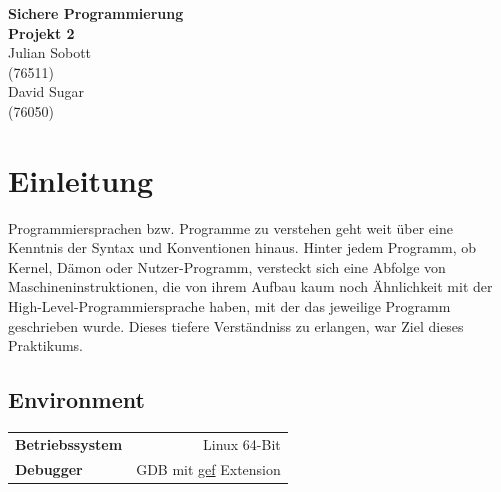 \documentclass[12pt]{article}
\begin{document}
\begin{center}
  \textbf{\LARGE Sichere Programmierung} \\[1ex]%
  \textbf{\Large Projekt 2}\\[2ex] %
  Julian Sobott \\ %
  (76511) \\ %
  David Sugar \\ %
  (76050) \\ %
  
\end{center}

\newpage
\tableofcontents
\newpage

\section{Einleitung}
Programmiersprachen bzw. Programme zu verstehen geht weit über eine Kenntnis der Syntax und Konventionen hinaus. Hinter jedem Programm, ob Kernel, Dämon oder Nutzer-Programm, versteckt sich eine Abfolge von Maschineninstruktionen, die von ihrem Aufbau kaum noch Ähnlichkeit mit der High-Level-Programmiersprache haben, mit der das jeweilige Programm geschrieben wurde. Dieses tiefere Verständniss zu erlangen, war Ziel dieses Praktikums.

\subsection{Environment}
\begin{table}[H]
\begin{tabular}{l | r}
	\textbf{Betriebssystem} & Linux 64-Bit \\
	\textbf{Debugger} & GDB mit \href{https://github.com/hugsy/gef}{gef} Extension \\
\end{tabular}
\end{table}
\end{document}
